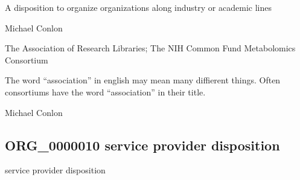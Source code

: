 \documentclass[letterpaper,10pt,english]{sphinxmanual}
\begin{document}
\begin{sphinxShadowBox}

\sphinxAtStartPar
{\hyperref[\detokenize{doc-BFO_0000016::doc}]{}}
\end{sphinxShadowBox}

\begin{sphinxShadowBox}

\sphinxAtStartPar
A disposition to organize organizations along industry or academic lines
\end{sphinxShadowBox}

\begin{sphinxShadowBox}

\sphinxAtStartPar
Michael Conlon 
\end{sphinxShadowBox}

\begin{sphinxShadowBox}

\sphinxAtStartPar
The Association of Research Libraries; The NIH Common Fund Metabolomics Consortium
\end{sphinxShadowBox}

\begin{sphinxShadowBox}

\sphinxAtStartPar
The word “association” in english may mean many diffierent things.  Often consortiums have the word “association” in their title.
\end{sphinxShadowBox}

\begin{sphinxShadowBox}

\sphinxAtStartPar
Michael Conlon 
\end{sphinxShadowBox}
\begin{quote}

\ignorespaces \end{quote}


\subsection{ORG\_0000010 \sphinxhyphen{} service provider disposition}
\label{\detokenize{doc-ORG_0000010:org-0000010-service-provider-disposition}}\label{\detokenize{doc-ORG_0000010:index-0}}\label{\detokenize{doc-ORG_0000010::doc}}
\begin{sphinxShadowBox}

\sphinxAtStartPar
service provider disposition
\end{sphinxShadowBox}
\end{document}
